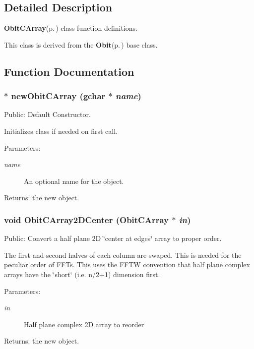 \subsection{Detailed Description}
{\bf Obit\-CArray}{\rm (p.\,\pageref{structObitCArray})} class function definitions. 

This class is derived from the {\bf Obit}{\rm (p.\,\pageref{structObit})} base class.

\subsection{Function Documentation}
\subsubsection{$\ast$ new\-Obit\-CArray (gchar $\ast$ {\em name})}\label{ObitCArray_8c_a6}


Public: Default Constructor. 

Initializes class if needed on first call. \begin{Desc}
\item[Parameters:]
\begin{description}
\item[{\em name}]An optional name for the object. \end{description}
\end{Desc}
\begin{Desc}
\item[Returns:]the new object. \end{Desc}
\subsubsection{\setlength{\rightskip}{0pt plus 5cm}void Obit\-CArray2DCenter ({\bf Obit\-CArray} $\ast$ {\em in})}\label{ObitCArray_8c_a38}


Public: Convert a half plane 2D \char`\"{}center at edges\char`\"{} array to proper order. 

The first and second halves of each column are swaped. This is needed for the peculiar order of FFTs. This uses the FFTW convention that half plane complex arrays have the \char`\"{}short\char`\"{} (i.e. n/2+1) dimension first. \begin{Desc}
\item[Parameters:]
\begin{description}
\item[{\em in}]Half plane complex 2D array to reorder \end{description}
\end{Desc}
\begin{Desc}
\item[Returns:]the new object. \end{Desc}
